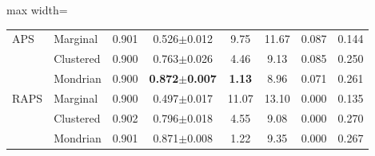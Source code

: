 \begin{table}[!t]
\begin{adjustbox}{max width=\textwidth}
\begin{tabular}{llcccccc}
\addlinespace[2pt]
APS & Marginal & 0.901 & 0.526$\pm$0.012 & 9.75 & 11.67 & 0.087 & 0.144\\
 & Clustered & 0.900 & 0.763$\pm$0.026 & 4.46 & 9.13 & 0.085 & 0.250\\
 & Mondrian & 0.900 & \textbf{0.872$\pm$0.007} & \textbf{1.13} & 8.96 & 0.071 & 0.261\\
\addlinespace[2pt]
RAPS & Marginal & 0.900 & 0.497$\pm$0.017 & 11.07 & 13.10 & 0.000 & 0.135\\
 & Clustered & 0.902 & 0.796$\pm$0.018 & 4.55 & 9.08 & 0.000 & 0.270\\
 & Mondrian & 0.901 & 0.871$\pm$0.008 & 1.22 & 9.35 & 0.000 & 0.267\\
\bottomrule
\end{tabular}\end{adjustbox}
\end{table}

